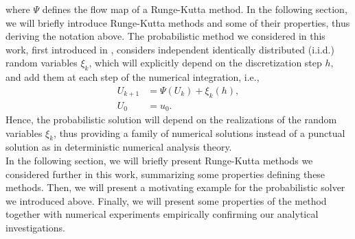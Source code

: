 where $\Psi$ defines the flow map of a Runge-Kutta method. In the following section, we will briefly introduce Runge-Kutta methods and some of their properties, thus deriving the notation above. The probabilistic method we considered in this work, first introduced in \cite{CGS16}, considers independent identically distributed (i.i.d.) random variables $\xi_k$, which will explicitly depend on the discretization step $h$, and add them at each step of the numerical integration, i.e., 
\begin{equation}\label{eq:probMethod}
\begin{aligned}
	U_{k+1} &= \Psi(U_k) + \xi_k(h), \\
	U_0 &= u_0.
\end{aligned}
\end{equation}
Hence, the probabilistic solution will depend on the realizations of the random variables $\xi_k$, thus providing a family of numerical solutions instead of a punctual solution as in deterministic numerical analysis theory. \\
In the following section, we will briefly present Runge-Kutta methods we considered further in this work, summarizing some properties defining these methods. Then, we will present a motivating example for the probabilistic solver we introduced above. Finally, we will present some properties of the method together with numerical experiments empirically confirming our analytical investigations. 




